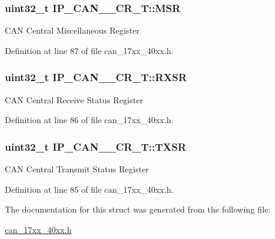 \subsubsection[{\texorpdfstring{M\+SR}{MSR}}]{ uint32\+\_\+t I\+P\+\_\+\+C\+A\+N\+\_\+\_\+\+C\+R\+\_\+\+T\+::\+M\+SR}\hypertarget{structIP__CAN__001__CR__T_a4cfec80b7875ddddf16f1b7284280423}{}\label{structIP__CAN__001__CR__T_a4cfec80b7875ddddf16f1b7284280423}
C\+AN Central Miscellaneous Register 

Definition at line 87 of file can\+\_\+17xx\+\_\+40xx.\+h.

\subsubsection[{\texorpdfstring{R\+X\+SR}{RXSR}}]{ uint32\+\_\+t I\+P\+\_\+\+C\+A\+N\+\_\+\_\+\+C\+R\+\_\+\+T\+::\+R\+X\+SR}\hypertarget{structIP__CAN__001__CR__T_a421bed687294a71ec89ece1ea01fc808}{}\label{structIP__CAN__001__CR__T_a421bed687294a71ec89ece1ea01fc808}
C\+AN Central Receive Status Register 

Definition at line 86 of file can\+\_\+17xx\+\_\+40xx.\+h.

\subsubsection[{\texorpdfstring{T\+X\+SR}{TXSR}}]{ uint32\+\_\+t I\+P\+\_\+\+C\+A\+N\+\_\+\_\+\+C\+R\+\_\+\+T\+::\+T\+X\+SR}\hypertarget{structIP__CAN__001__CR__T_a7ce56eda4c7eabebb9597b8b9cd418ac}{}\label{structIP__CAN__001__CR__T_a7ce56eda4c7eabebb9597b8b9cd418ac}
C\+AN Central Transmit Status Register 

Definition at line 85 of file can\+\_\+17xx\+\_\+40xx.\+h.



The documentation for this struct was generated from the following file\+:\begin{DoxyCompactItemize}
\item 
\hyperlink{can__17xx__40xx_8h}{can\+\_\+17xx\+\_\+40xx.\+h}\end{DoxyCompactItemize}
